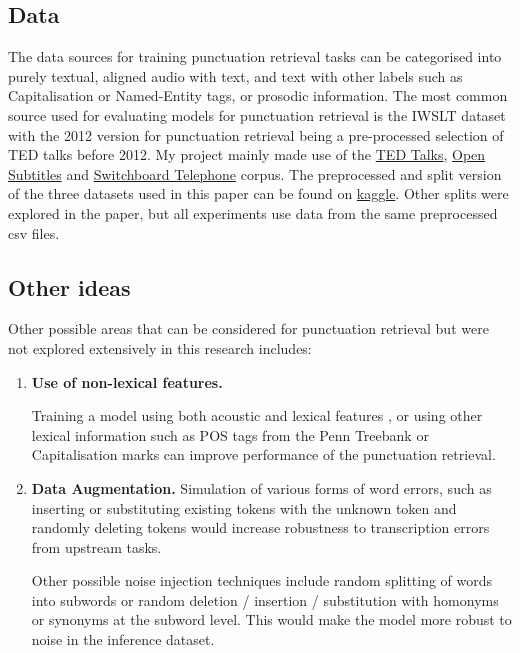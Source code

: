 \documentclass[a4paper]{article}
\begin{document}
\begin{multicols}{2}
\subsection{Data}
The data sources for training punctuation retrieval tasks can be categorised into purely textual, aligned audio with text, and text with other labels such as Capitalisation or Named-Entity tags, or prosodic information.
The most common source used for evaluating models for punctuation retrieval is the IWSLT dataset with the 2012 version for punctuation retrieval being a pre-processed selection of TED talks before 2012. My project mainly made use of the \hyperlink{https://www.kaggle.com/miguelcorraljr/ted-ultimate-dataset}{TED Talks}, \hyperlink{http://opus.nlpl.eu/OpenSubtitles-v2018.php}{Open Subtitles} and \hyperlink{https://catalog.ldc.upenn.edu/docs/LDC97S62/swb1_dialogact_annot.tar.gz}{Switchboard Telephone} corpus. The preprocessed and split version of the three datasets used in this paper can be found on  \href{https://www.kaggle.com/ngxingyu/preprocessed-english-spoken-transcripts}{kaggle}. Other splits were explored in the paper, but all experiments use data from the same preprocessed csv files.

\subsection{Other ideas}\label{other ideas}
Other possible areas that can be considered for punctuation retrieval but were not explored extensively in this research includes:
\begin{enumerate}
    \item \textbf{Use of non-lexical features.} 
    
    Training a model using both acoustic and lexical features \citep{multimodalsemi}, or using other lexical information such as POS tags from the Penn Treebank \cite{adversarial} or Capitalisation marks can improve performance of the punctuation retrieval. 
    
    \item \textbf{Data Augmentation.} 
    Simulation of various forms of word errors, such as inserting or substituting existing tokens with the unknown token and randomly deleting tokens would increase robustness to transcription errors from upstream tasks. \citep{noisy} 
    
    Other possible noise injection techniques include random splitting of words into subwords or random deletion / insertion / substitution with homonyms or synonyms at the subword level. This would make the model more robust to noise in the inference dataset.
    

\end{enumerate}
\end{multicols}
\end{document}

